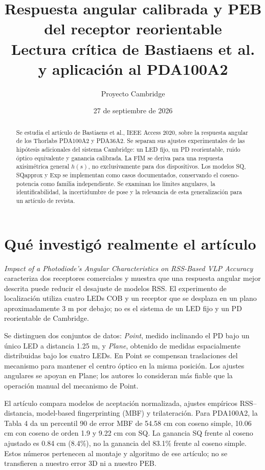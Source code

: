 \documentclass[11pt,a4paper]{article}
\title{Respuesta angular calibrada y PEB del receptor reorientable\\\large Lectura crítica de Bastiaens et al. y aplicación al PDA100A2}
\author{Proyecto Cambridge}
\date{27 de septiembre de 2026}
\begin{document}
\maketitle
\begin{abstract}
Se estudia el artículo de Bastiaens et al., IEEE Access 2020, sobre la respuesta angular de los Thorlabs PDA100A2 y PDA36A2. Se separan sus ajustes experimentales de las hipótesis adicionales del sistema Cambridge: un LED fijo, un PD reorientable, ruido óptico equivalente y ganancia calibrada. La FIM se deriva para una respuesta axisimétrica general $h(s)$, no exclusivamente para dos dispositivos. Los modelos SQ, SQapprox y Exp se implementan como casos documentados, conservando el coseno-potencia como familia independiente. Se examinan los límites angulares, la identificabilidad, la incertidumbre de pose y la relevancia de esta generalización para un artículo de revista.
\end{abstract}
\tableofcontents
\clearpage

\section{Qué investigó realmente el artículo}
\emph{Impact of a Photodiode's Angular Characteristics on RSS-Based VLP Accuracy} \cite{bastiaens2020} caracteriza dos receptores comerciales y muestra que una respuesta angular mejor descrita puede reducir el desajuste de modelos RSS. El experimento de localización utiliza cuatro LEDs COB y un receptor que se desplaza en un plano aproximadamente 3 m por debajo; no es el sistema de un LED fijo y un PD reorientable de Cambridge.

Se distinguen dos conjuntos de datos: \emph{Point}, medido inclinando el PD bajo un único LED a distancia 1.25 m, y \emph{Plane}, obtenido de medidas espacialmente distribuidas bajo los cuatro LEDs. En Point se compensan traslaciones del mecanismo para mantener el centro óptico en la misma posición. Los ajustes angulares se apoyan en Plane; los autores lo consideran más fiable que la operación manual del mecanismo de Point.

El artículo compara modelos de aceptación normalizada, ajustes empíricos RSS--distancia, model-based fingerprinting (MBF) y trilateración. Para PDA100A2, la Tabla 4 da un percentil 90 de error MBF de 54.58 cm con coseno simple, 10.06 cm con coseno de orden 1.9 y 9.22 cm con SQ. La ganancia SQ frente al coseno ajustado es 0.84 cm (8.4\%), no la ganancia del 83.1\% frente al coseno simple. Estos números pertenecen al montaje y algoritmo de ese artículo; no se transfieren a nuestro error 3D ni a nuestro PEB.
\end{document}
